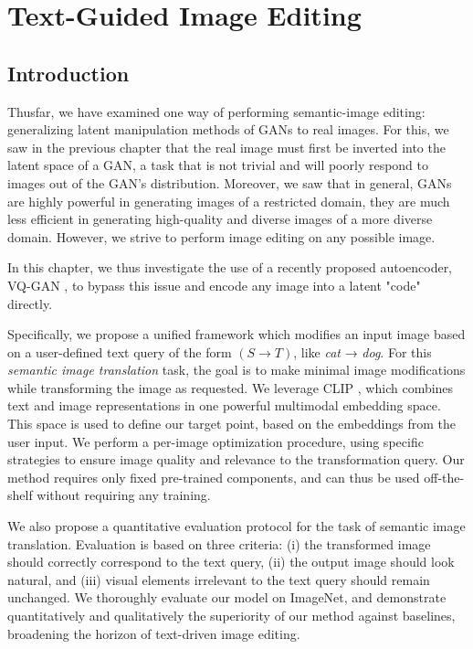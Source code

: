 \chapter{Text-Guided Image Editing}
\label{chapter:flexit}




\section{Introduction}

Thusfar, we have examined one way of performing semantic-image editing: 
generalizing latent manipulation methods of \ac{GAN}s to real images. For this, 
we saw in the previous chapter that the real image must first be inverted into 
the latent space of a \ac{GAN}, a task that is not trivial and will poorly respond to 
 images out of the \ac{GAN}'s distribution. Moreover, we saw that in general, \ac{GAN}s 
 are highly powerful in generating images of a restricted domain, they are much less 
 efficient in generating high-quality and diverse images of a more diverse domain. 
 However, we strive to perform image editing on any possible image. 
 
 In this chapter, 
 we thus investigate the use of a recently proposed autoencoder, VQ-GAN \citep{esser2021taming}, 
 to bypass this issue and encode any image into a latent "code" directly. 
 
Specifically, we propose  a unified framework which modifies an input image based
 on a user-defined text query of the form $(S \rightarrow T)$, like \textit{cat} → \textit{dog}.
  For this \textit{semantic image translation} task, the goal is to make minimal image
   modifications  while transforming the image as requested.
We leverage \ac{CLIP} \citep{radford2021learning},  which combines text and image representations in 
one powerful multimodal embedding space. This space is used to define our target point,
 based on the embeddings from the user input. We perform a per-image optimization 
 procedure, using specific  strategies to ensure image quality and relevance to the 
 transformation query. Our method requires only fixed pre-trained components, and can 
 thus be used off-the-shelf  without  requiring any training. 

We also propose a quantitative evaluation protocol for the task of semantic image 
translation. 
Evaluation is based on three criteria: (i) the transformed image should correctly 
correspond to the text query, (ii) the output image should look natural,  and (iii) 
visual elements irrelevant to the text query should remain unchanged. 
We thoroughly evaluate our model on ImageNet, and  demonstrate quantitatively and 
qualitatively the superiority of our method against baselines, broadening the horizon 
of text-driven image editing.


